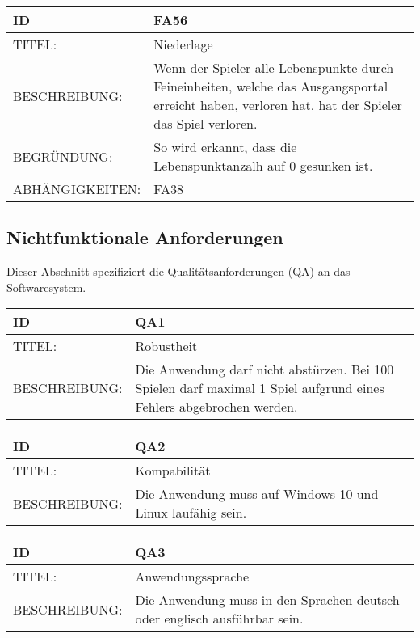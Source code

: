 \documentclass{uulm-assignment}
\begin{document}
\begin{tabularx}{16cm}{l|X}
\textbf{ID} & \textbf{FA56} \\
\hline
TITEL: & Niederlage \\
\hline
BESCHREIBUNG: & Wenn der Spieler alle Lebenspunkte durch Feineinheiten, welche das Ausgangsportal erreicht haben, verloren hat, hat der Spieler das Spiel verloren.
\\
\hline
BEGRÜNDUNG: & So wird erkannt, dass die Lebenspunktanzalh auf 0 gesunken ist. \\
\hline
ABHÄNGIGKEITEN: & FA38\\
\end{tabularx}

\subsection{Nichtfunktionale Anforderungen}

Dieser Abschnitt spezifiziert die Qualitätsanforderungen (QA) an das Softwaresystem.

\begin{tabularx}{16cm}{l|X}
\textbf{ID} & \textbf{QA1} \\
\hline
TITEL: & Robustheit \\
\hline
BESCHREIBUNG: & Die Anwendung darf nicht abstürzen. Bei 100 Spielen darf maximal 1 Spiel
aufgrund eines Fehlers abgebrochen werden. \\ 
\end{tabularx}

\begin{tabularx}{16cm}{l|X}
\textbf{ID} & \textbf{QA2} \\
\hline
TITEL: &  Kompabilität\\ 
\hline
BESCHREIBUNG: & Die Anwendung muss auf Windows 10 und Linux laufähig sein. \\ 
\end{tabularx}

\begin{tabularx}{16cm}{l|X}
\textbf{ID} & \textbf{QA3} \\
\hline
TITEL: & Anwendungssprache \\ 
\hline
BESCHREIBUNG: & Die Anwendung muss in den Sprachen deutsch oder englisch ausführbar sein.  \\ 
\end{tabularx}
\end{document}

